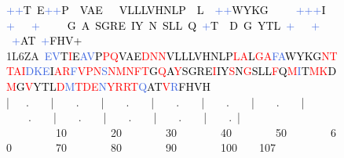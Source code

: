 \begin{figure}[p]
\begin{center}
{{\begin{minipage}{0.2\textwidth}
\begin{tiny}
\begin{tabbing}
\>\textcolor{RoyalBlue}{++}\textcolor{black}{T}\textcolor{red}{\ }\textcolor{black}{E}\textcolor{RoyalBlue}{++}\textcolor{black}{P}\textcolor{red}{\ \ }\textcolor{black}{VAE}\textcolor{red}{\ \ \ }\textcolor{black}{VLLLVHNLP}\textcolor{red}{\ \ }\textcolor{black}{L}\textcolor{red}{\ \ }\textcolor{RoyalBlue}{++}\textcolor{black}{WYKG}\textcolor{red}{\ \ \ \ \ }\textcolor{RoyalBlue}{+++}\textcolor{black}{I}\textcolor{red}{\ \ }\textcolor{RoyalBlue}{+}\textcolor{red}{\ \ \ }\textcolor{RoyalBlue}{+}\textcolor{red}{\ \ \ \ \ }\textcolor{black}{G}\textcolor{red}{\ }\textcolor{black}{A}\textcolor{red}{\ }\textcolor{black}{SGRE}\textcolor{red}{\ }\textcolor{black}{IY}\textcolor{red}{\ }\textcolor{black}{N}\textcolor{red}{\ }\textcolor{black}{SLL}\textcolor{red}{\ }\textcolor{black}{Q}\textcolor{red}{\ }\textcolor{RoyalBlue}{+}\textcolor{black}{T}\textcolor{red}{\ \ }\textcolor{black}{D}\textcolor{red}{\ }\textcolor{black}{G}\textcolor{red}{\ }\textcolor{black}{YTL}\textcolor{red}{\ }\textcolor{RoyalBlue}{+}\textcolor{red}{\ \ \ }\textcolor{RoyalBlue}{+}\textcolor{red}{\ \ \ \ }\textcolor{RoyalBlue}{+}\textcolor{black}{AT}\textcolor{red}{\ }\textcolor{RoyalBlue}{+}\textcolor{black}{FHV+}\\
1L6ZA\ \textcolor{RoyalBlue}{EV}\textcolor{black}{T}\textcolor{red}{I}\textcolor{black}{E}\textcolor{RoyalBlue}{AV}\textcolor{black}{P}\textcolor{red}{PQ}\textcolor{black}{VAE}\textcolor{red}{DNN}\textcolor{black}{VLLLVHNLP}\textcolor{red}{LA}\textcolor{black}{L}\textcolor{red}{GA}\textcolor{RoyalBlue}{FA}\textcolor{black}{WYKG}\textcolor{red}{NTTAI}\textcolor{RoyalBlue}{DKE}\textcolor{black}{I}\textcolor{red}{AR}\textcolor{RoyalBlue}{F}\textcolor{red}{VPN}\textcolor{RoyalBlue}{S}\textcolor{red}{NMNFT}\textcolor{black}{G}\textcolor{red}{Q}\textcolor{black}{A}\textcolor{red}{Y}\textcolor{black}{SGRE}\textcolor{red}{I}\textcolor{black}{IY}\textcolor{red}{S}\textcolor{black}{N}\textcolor{red}{G}\textcolor{black}{SLL}\textcolor{red}{F}\textcolor{black}{Q}\textcolor{red}{M}\textcolor{RoyalBlue}{I}\textcolor{black}{T}\textcolor{red}{MK}\textcolor{black}{D}\textcolor{red}{M}\textcolor{black}{G}\textcolor{red}{V}\textcolor{black}{YTL}\textcolor{red}{D}\textcolor{RoyalBlue}{M}\textcolor{red}{TDE}\textcolor{RoyalBlue}{N}\textcolor{red}{YRRT}\textcolor{RoyalBlue}{Q}\textcolor{black}{AT}\textcolor{red}{V}\textcolor{RoyalBlue}{R}\textcolor{black}{FHVH}\\
\>|\ \ \ .\ \ \ \ |\ \ \ \ .\ \ \ \ |\ \ \ \ .\ \ \ \ |\ \ \ \ .\ \ \ \ |\ \ \ \ .\ \ \ \ |\ \ \ \ .\ \ \ \ |\ \ \ \ .\ \ \ \ |\ \ \ \ .\ \ \ \ |\ \ \ \ .\ \ \ \ |\ \ \ \ .\ \ \ \ |\ \ \ \ .\ |\\\
\ \ \ \ \ \ \ \ 10\ \ \ \ \ \ \ \ 20\ \ \ \ \ \ \ \ 30\ \ \ \ \ \ \ \ 40\ \ \ \ \ \ \ \ 50\ \ \ \ \ \ \ \ 60\ \ \ \ \ \ \ \ 70\ \ \ \ \ \ \ \ 80\ \ \ \ \ \ \ \ 90\ \ \ \ \ \ \ \ 100\ \ \ \ 107\\


\end{tabbing}
\end{tiny}
\end{minipage}}}
\end{center}
\end{figure}
